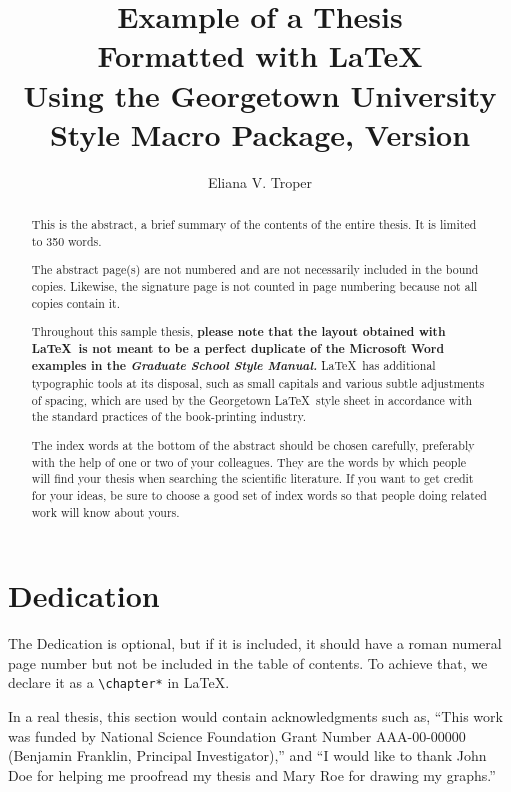 \documentclass[12pt]{report}
\title{Example of a Thesis \\
       Formatted with LaTeX \\
       Using the Georgetown University \\
       Style Macro Package, Version \guthesisversion}
\author{Eliana V. Troper}
\begin{document}

\maketitle    %

\begin{abstract}
This is the abstract, a brief summary of the contents of the entire thesis.
It is limited to 350 words.

The abstract page(s) are not numbered and are not necessarily included
in the bound copies.  Likewise, the signature page is not counted in
page numbering because not all copies contain it.

Throughout this sample thesis, {\bf please note
that the layout obtained with \LaTeX\ is not meant to be a
perfect duplicate of the Microsoft Word examples in the \emph{Graduate
School Style Manual.}}  \LaTeX\ has additional typographic tools at its
disposal, such as {\sc small capitals} and various subtle adjustments
of spacing, which are used by the Georgetown \LaTeX\ style sheet in
accordance with the standard practices of the book-printing industry.

The index words at the bottom of the abstract should be chosen carefully,
preferably with the help of one or two of your colleagues.
They are the words by which people will find your thesis when searching
the scientific literature.
If you want to get credit for your ideas, be sure to choose a good set of
index words so that people doing related work will know about yours.
\end{abstract}


\chapter*{Dedication}

The Dedication is optional, but if it is included, it should have
a roman numeral page number but not be included in the table of
contents.  To achieve that, we declare it as a \verb"\chapter*" in \LaTeX.



In a real thesis, this section would contain acknowledgments such
as, ``This work was funded by National Science Foundation Grant
Number AAA-00-00000 (Benjamin Franklin, Principal Investigator),''
and ``I would like to thank John Doe for helping me proofread my
thesis and Mary Roe for drawing my graphs.''
\end{document}
